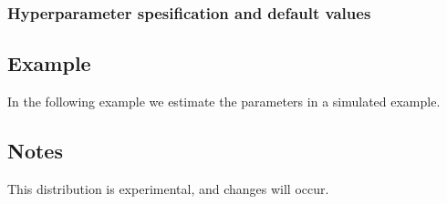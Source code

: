 \documentclass[a4paper,11pt]{article}
\begin{document}
\subsubsection*{Hyperparameter spesification and default values}


\subsection*{Example}

In the following example we estimate the parameters in a simulated
example.


\subsection*{Notes}

This distribution is experimental, and changes will occur.
\end{document}
